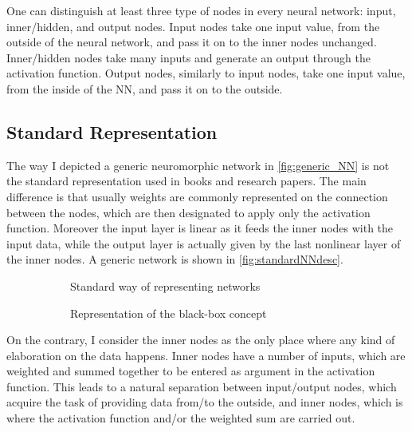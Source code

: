 One can distinguish at least three type of nodes in every neural network: input, inner/hidden, and output nodes.
Input nodes take one input value, from the outside of the neural network, and pass it on to the inner nodes unchanged.
Inner/hidden nodes take many inputs and generate an output through the activation function.
Output nodes, similarly to input nodes, take one input value, from the inside of the NN, and pass it on to the outside.

\subsection*{Standard Representation}
The way I depicted a generic neuromorphic network in \autoref{fig:generic_NN} is not the standard representation used in books and research papers.
The main difference is that usually weights are commonly represented on the connection between the nodes, which are then designated to apply only the activation function.
Moreover the input layer is linear as it feeds the inner nodes with the input data, while the output layer is actually given by the last nonlinear layer of the inner nodes.
A generic network is shown in \autoref{fig:standardNNdesc}.

\begin{figure}[ht]
	\begin{subfigure}[b]{0.49\textwidth}
		\centering
		
		\caption{Standard way of representing networks}
		\label{fig:standardNNdesc}
  \end{subfigure}
  \begin{subfigure}[b]{0.49\textwidth}
  		\centering
		
		\caption{Representation of the black-box concept}
		\label{fig:black_box_NN}
  \end{subfigure}
  \caption{}
  	\label{fig:description_comparison}
\end{figure}

On the contrary, I consider the inner nodes as the only place where any kind of elaboration on the data happens.
Inner nodes have a number of inputs, which are weighted and summed together to be entered as argument in the activation function.
This leads to a natural separation between input/output nodes, which acquire the task of providing data from/to the outside, and inner nodes, which is where the activation function and/or the weighted sum are carried out.

